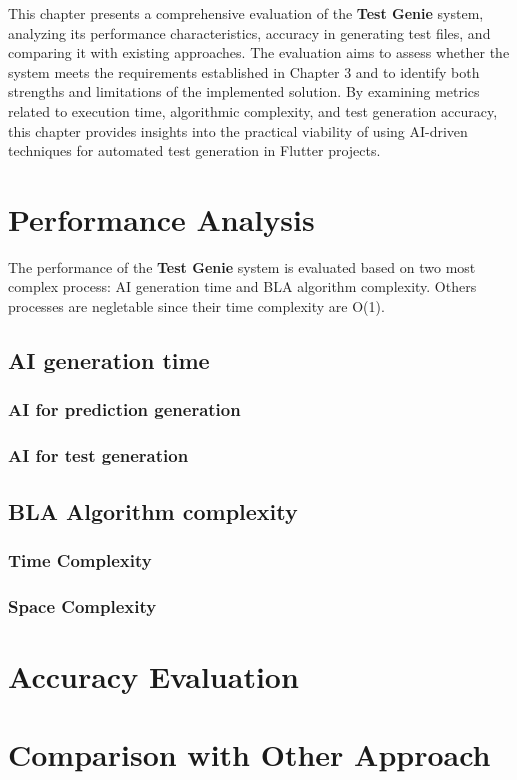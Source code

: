 This chapter presents a comprehensive evaluation of the \textbf{Test Genie} system, analyzing its performance characteristics, accuracy in generating test files, and comparing it with existing approaches. The evaluation aims to assess whether the system meets the requirements established in Chapter 3 and to identify both strengths and limitations of the implemented solution. By examining metrics related to execution time, algorithmic complexity, and test generation accuracy, this chapter provides insights into the practical viability of using AI-driven techniques for automated test generation in Flutter projects.

\section{Performance Analysis}

The performance of the \textbf{Test Genie} system is evaluated based on two most complex process: AI generation time and BLA algorithm complexity. Others processes are negletable since their time complexity are O(1). 

\subsection{AI generation time}

\subsubsection{AI for prediction generation}

\subsubsection{AI for test generation}

\subsection{BLA Algorithm complexity}

\subsubsection{Time Complexity}

\subsubsection{Space Complexity}

\section{Accuracy Evaluation}


\section{Comparison with Other Approach}
